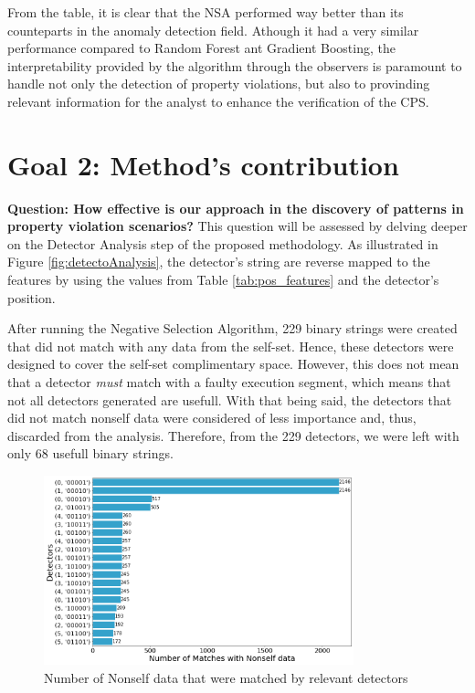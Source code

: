 From the table, it is clear that the NSA performed way better than its counteparts in the anomaly detection field. Athough it had a very similar performance compared to Random Forest ant Gradient Boosting, the interpretability provided by the algorithm through the observers is paramount to handle not only the detection of property violations, but also to provinding relevant information for the analyst to enhance the verification of the CPS.

\section{Goal 2: Method's contribution}
\textbf{Question: How effective is our approach in the discovery of patterns in property violation scenarios?} This question will be assessed by delving deeper on the Detector Analysis step of the proposed methodology. As illustrated in Figure \ref{fig:detectoAnalysis}, the detector's string are reverse mapped to the features by using the values from Table \ref{tab:pos_features} and the detector's position. 

After running the Negative Selection Algorithm, 229 binary strings were created that did not match with any data from the self-set. Hence, these detectors were designed to cover the self-set complimentary space. However, this does not mean that a detector \textit{must} match with a faulty execution segment, which means that not all detectors generated are usefull. With that being said, the detectors that did not match nonself data were considered of less importance and, thus, discarded from the analysis. Therefore, from the 229 detectors, we were left with only 68 usefull binary strings. 

\begin{figure}[]
	\centering
	\includegraphics[width=0.8\textwidth, keepaspectratio]{img/matches_by_detector_rdz.png}
	\caption{Number of Nonself data that were matched by relevant detectors}
	\label{fig:ev_det_match}
\end{figure}

